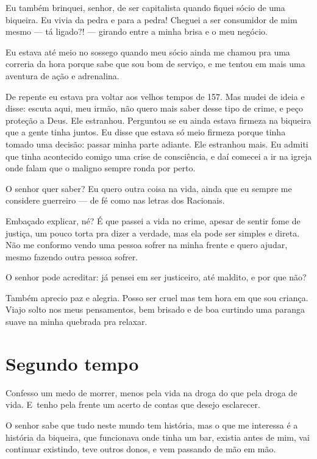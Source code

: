 Eu também brinquei, senhor, de ser capitalista quando fiquei sócio de
uma biqueira. Eu vivia da pedra e para a pedra! Cheguei a ser consumidor
de mim mesmo --- tá ligado?! --- girando entre a minha brisa e o meu
negócio.

Eu estava até meio no sossego quando meu sócio ainda me chamou pra uma
correria da hora porque sabe que sou bom de serviço, e me tentou em mais
uma aventura de ação e adrenalina.

De repente eu estava pra voltar aos velhos tempos de 157. Mas mudei de
ideia e disse: escuta aqui, meu irmão, não quero mais saber desse tipo
de crime, e peço proteção a Deus. Ele estranhou. Perguntou se eu ainda
estava firmeza na biqueira que a gente tinha juntos. Eu disse que estava
só meio firmeza porque tinha tomado uma decisão: passar minha parte
adiante. Ele estranhou mais. Eu admiti que tinha acontecido comigo uma
crise de consciência, e daí comecei a ir na igreja onde falam que o
maligno sempre ronda por perto.

O senhor quer saber? Eu quero outra coisa na vida, ainda que eu sempre
me considere guerreiro --- de fé como nas letras dos Racionais.

Embaçado explicar, né? É que passei a vida no crime, apesar de sentir
fome de justiça, um pouco torta pra dizer a verdade, mas ela pode ser
simples e direta. Não me conformo vendo uma pessoa sofrer na minha
frente e quero ajudar, mesmo fazendo outra pessoa sofrer.

O senhor pode acreditar: já pensei em ser justiceiro, até maldito, e por
que não?

Também aprecio paz e alegria. Posso ser cruel mas tem hora em que sou
criança. Viajo solto nos meus pensamentos, bem brisado e de boa curtindo
uma paranga suave na minha quebrada pra relaxar.

 

\section{Segundo tempo}

 

Confesso um medo de morrer, menos pela vida na droga do que pela droga
de vida. E~tenho pela frente um acerto de contas que desejo esclarecer.

O senhor sabe que tudo neste mundo tem história, mas o que me interessa
é a história da biqueira, que funcionava onde tinha um bar, existia
antes de mim, vai continuar existindo, teve outros donos, e vem passando
de mão em mão.

